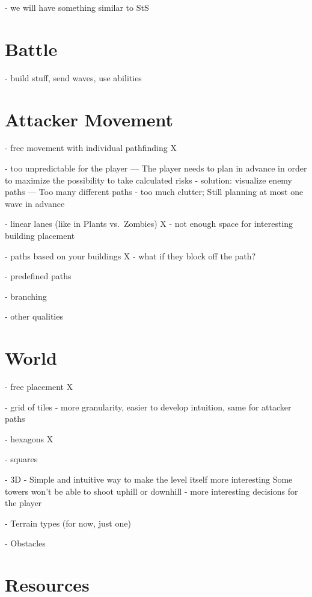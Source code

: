 - we will have something similar to StS

\section{Battle}

- build stuff, send waves, use abilities

\section{Attacker Movement}

- free movement with individual pathfinding X

- too unpredictable for the player --- The player needs to plan in advance in order to maximize the possibility to take calculated risks
- solution: visualize enemy paths --- Too many different paths - too much clutter; Still planning at most one wave in advance

- linear lanes (like in Plants vs.\ Zombies) X
- not enough space for interesting building placement

- paths based on your buildings X
- what if they block off the path?

- predefined paths \checkmark

- branching

- other qualities

\section{World}

- free placement X

- grid of tiles \checkmark
- more granularity, easier to develop intuition, same for attacker paths

- hexagons X

- squares \checkmark

- 3D \checkmark
- Simple and intuitive way to make the level itself more interesting
Some towers won't be able to shoot uphill or downhill - more interesting decisions for the player

- Terrain types (for now, just one)

- Obstacles

\section{Resources}


